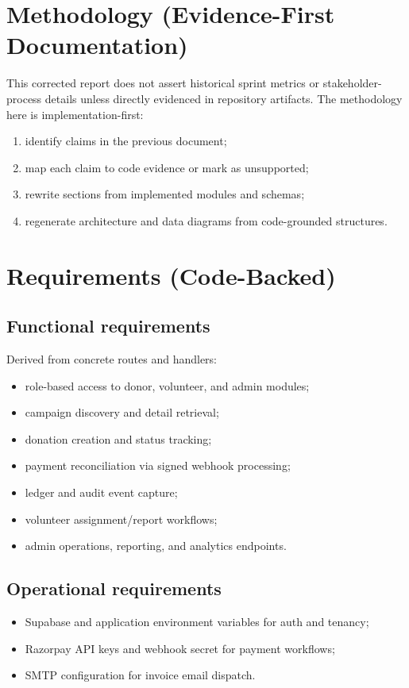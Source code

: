 \documentclass[12pt,a4paper]{article}
\begin{document}
\section{Methodology (Evidence-First Documentation)}
This corrected report does not assert historical sprint metrics or stakeholder-process details unless directly evidenced in repository artifacts. The methodology here is implementation-first:
\begin{enumerate}
  \item identify claims in the previous document;
  \item map each claim to code evidence or mark as unsupported;
  \item rewrite sections from implemented modules and schemas;
  \item regenerate architecture and data diagrams from code-grounded structures.
\end{enumerate}

\section{Requirements (Code-Backed)}
\subsection{Functional requirements}
Derived from concrete routes and handlers:
\begin{itemize}
  \item role-based access to donor, volunteer, and admin modules;
  \item campaign discovery and detail retrieval;
  \item donation creation and status tracking;
  \item payment reconciliation via signed webhook processing;
  \item ledger and audit event capture;
  \item volunteer assignment/report workflows;
  \item admin operations, reporting, and analytics endpoints.
\end{itemize}

\subsection{Operational requirements}
\begin{itemize}
  \item Supabase and application environment variables for auth and tenancy;
  \item Razorpay API keys and webhook secret for payment workflows;
  \item SMTP configuration for invoice email dispatch.
\end{itemize}
\end{document}
